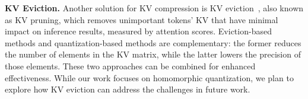 
\medskip
\noindent\textbf{KV Eviction.}
Another solution for KV compression is KV eviction~\cite{h2o2023zhang, ge2023model, scissorhands2023liu, pyramidinfer, l2norm-kv, keyformer, dynamic-context-pruning, infinigen, zhang2024efficientsparseattentionneeds, jiang2024minference}, also known as KV pruning, which removes unimportant tokens' KV that have minimal impact on inference results, measured by attention scores.
Eviction-based methods and quantization-based methods are complementary: the former reduces the number of elements in the KV matrix, while the latter lowers the precision of those elements. These two approaches can be combined for enhanced effectiveness. While our work focuses on homomorphic quantization, we plan to explore how KV eviction can address the challenges in future work.


